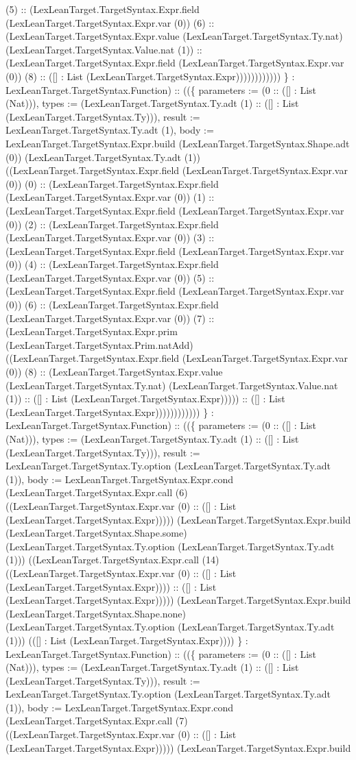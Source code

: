 \documentclass[11pt]{article}
\begin{document}
(5) :: (LexLeanTarget.TargetSyntax.Expr.field (LexLeanTarget.TargetSyntax.Expr.var (0)) (6) :: (LexLeanTarget.TargetSyntax.Expr.value (LexLeanTarget.TargetSyntax.Ty.nat) (LexLeanTarget.TargetSyntax.Value.nat (1)) :: (LexLeanTarget.TargetSyntax.Expr.field (LexLeanTarget.TargetSyntax.Expr.var (0)) (8) :: ([] : List (LexLeanTarget.TargetSyntax.Expr)))))))))))) \} : LexLeanTarget.TargetSyntax.Function) :: ((\{ parameters := (0 :: ([] : List (Nat))), types := (LexLeanTarget.TargetSyntax.Ty.adt (1) :: ([] : List (LexLeanTarget.TargetSyntax.Ty))), result := LexLeanTarget.TargetSyntax.Ty.adt (1), body := LexLeanTarget.TargetSyntax.Expr.build (LexLeanTarget.TargetSyntax.Shape.adt (0)) (LexLeanTarget.TargetSyntax.Ty.adt (1)) ((LexLeanTarget.TargetSyntax.Expr.field (LexLeanTarget.TargetSyntax.Expr.var (0)) (0) :: (LexLeanTarget.TargetSyntax.Expr.field (LexLeanTarget.TargetSyntax.Expr.var (0)) (1) :: (LexLeanTarget.TargetSyntax.Expr.field (LexLeanTarget.TargetSyntax.Expr.var (0)) (2) :: (LexLeanTarget.TargetSyntax.Expr.field (LexLeanTarget.TargetSyntax.Expr.var (0)) (3) :: (LexLeanTarget.TargetSyntax.Expr.field (LexLeanTarget.TargetSyntax.Expr.var (0)) (4) :: (LexLeanTarget.TargetSyntax.Expr.field (LexLeanTarget.TargetSyntax.Expr.var (0)) (5) :: (LexLeanTarget.TargetSyntax.Expr.field (LexLeanTarget.TargetSyntax.Expr.var (0)) (6) :: (LexLeanTarget.TargetSyntax.Expr.field (LexLeanTarget.TargetSyntax.Expr.var (0)) (7) :: (LexLeanTarget.TargetSyntax.Expr.prim (LexLeanTarget.TargetSyntax.Prim.natAdd) ((LexLeanTarget.TargetSyntax.Expr.field (LexLeanTarget.TargetSyntax.Expr.var (0)) (8) :: (LexLeanTarget.TargetSyntax.Expr.value (LexLeanTarget.TargetSyntax.Ty.nat) (LexLeanTarget.TargetSyntax.Value.nat (1)) :: ([] : List (LexLeanTarget.TargetSyntax.Expr))))) :: ([] : List (LexLeanTarget.TargetSyntax.Expr)))))))))))) \} : LexLeanTarget.TargetSyntax.Function) :: ((\{ parameters := (0 :: ([] : List (Nat))), types := (LexLeanTarget.TargetSyntax.Ty.adt (1) :: ([] : List (LexLeanTarget.TargetSyntax.Ty))), result := LexLeanTarget.TargetSyntax.Ty.option (LexLeanTarget.TargetSyntax.Ty.adt (1)), body := LexLeanTarget.TargetSyntax.Expr.cond (LexLeanTarget.TargetSyntax.Expr.call (6) ((LexLeanTarget.TargetSyntax.Expr.var (0) :: ([] : List (LexLeanTarget.TargetSyntax.Expr))))) (LexLeanTarget.TargetSyntax.Expr.build (LexLeanTarget.TargetSyntax.Shape.some) (LexLeanTarget.TargetSyntax.Ty.option (LexLeanTarget.TargetSyntax.Ty.adt (1))) ((LexLeanTarget.TargetSyntax.Expr.call (14) ((LexLeanTarget.TargetSyntax.Expr.var (0) :: ([] : List (LexLeanTarget.TargetSyntax.Expr)))) :: ([] : List (LexLeanTarget.TargetSyntax.Expr))))) (LexLeanTarget.TargetSyntax.Expr.build (LexLeanTarget.TargetSyntax.Shape.none) (LexLeanTarget.TargetSyntax.Ty.option (LexLeanTarget.TargetSyntax.Ty.adt (1))) (([] : List (LexLeanTarget.TargetSyntax.Expr)))) \} : LexLeanTarget.TargetSyntax.Function) :: ((\{ parameters := (0 :: ([] : List (Nat))), types := (LexLeanTarget.TargetSyntax.Ty.adt (1) :: ([] : List (LexLeanTarget.TargetSyntax.Ty))), result := LexLeanTarget.TargetSyntax.Ty.option (LexLeanTarget.TargetSyntax.Ty.adt (1)), body := LexLeanTarget.TargetSyntax.Expr.cond (LexLeanTarget.TargetSyntax.Expr.call (7) ((LexLeanTarget.TargetSyntax.Expr.var (0) :: ([] : List (LexLeanTarget.TargetSyntax.Expr))))) (LexLeanTarget.TargetSyntax.Expr.build 
\end{document}
